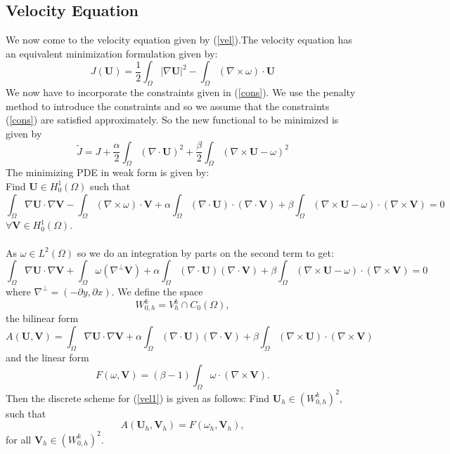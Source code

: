 \documentclass[11pt]{article}
\begin{document}
\subsection{Velocity Equation}

We now come to the velocity equation given by (\ref{vel}).The velocity equation has an equivalent minimization formulation
given by:
$$
J(\textbf{U}) = \frac{1}{2}\int_\Omega|\nabla\textbf{U}|^2 -\int_\Omega(\nabla\times\omega)\cdot\textbf{U}
$$
We now have to incorporate the constraints given in (\ref{cons}). We use the penalty method to introduce the constraints
and so we assume that the constraints (\ref{cons}) are satisfied approximately. So the new functional to be minimized is
given by 
$$
\widetilde{J} = J + \frac{\alpha}{2}\int_\Omega(\nabla\cdot\textbf{U})^2 + \frac{\beta}{2}\int_\Omega(\nabla\times\textbf{U}-\omega)^2
$$
The minimizing PDE in weak form is given by:\\
Find $\textbf{U}\in H_0^1(\Omega)$ such that
\begin{equation}
\int_\Omega\nabla\textbf{U}\cdot\nabla\textbf{V} -\int_\Omega(\nabla\times\omega)\cdot\textbf{V}
+\alpha\int_\Omega(\nabla\cdot\textbf{U})\cdot(\nabla\cdot\textbf{V}) +\beta\int_\Omega(\nabla\times\textbf{U}
-\omega)\cdot(\nabla\times\textbf{V})=0
\end{equation}
\hspace{130mm}$\forall \textbf{V} \in H^1_0(\Omega)$.\\\\
As $\omega\in L^2(\Omega)$ so we do an integration by parts on the second term to get:
\begin{equation}\label{vel1}
\int_\Omega\nabla\textbf{U}\cdot\nabla\textbf{V} +\int_\Omega\omega(\nabla^\bot\textbf{V})
+\alpha\int_\Omega(\nabla\cdot\textbf{U})(\nabla\cdot\textbf{V}) +\beta\int_\Omega(\nabla\times\textbf{U}
-\omega)\cdot(\nabla\times\textbf{V})=0
\end{equation}
where $\nabla^\bot = (-\partial{y}, \partial{x})$.
We define the space
\begin{equation}\label{space}
W_{0,h}^k = V_h^k \cap C_0(\Omega),
\end{equation}
the bilinear form 
\begin{equation}\label{bilinear_form}
A(\textbf{U},\textbf{V}) = \int_\Omega\nabla\textbf{U}\cdot\nabla\textbf{V}
+\alpha\int_\Omega(\nabla\cdot\textbf{U})(\nabla\cdot\textbf{V}) +\beta\int_\Omega(\nabla\times\textbf{U})
\cdot(\nabla\times\textbf{V})
\end{equation}
and the linear form
\begin{equation}\label{linear_form}
F(\omega,\textbf{V}) = (\beta-1)\int_\Omega \omega\cdot(\nabla\times \textbf{V}).
\end{equation}
Then the discrete scheme for (\ref{vel1}) is given as follows: Find $\textbf{U}_h \in (W_{0,h}^k)^2$, such that
\begin{equation}\label{vel_scheme}
A(\textbf{U}_h,\textbf{V}_h)= F(\omega_h,\textbf{V}_h),
\end{equation}
for all $\textbf{V}_h \in (W_{0,h}^k)^2$.
\end{document}
